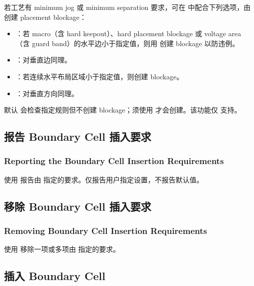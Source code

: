 若工艺有 minimum jog 或 minimum separation 要求，可在  中配合下列选项，由  创建 placement blockage：
\begin{itemize}
  \item {}：若 macro（含 hard keepout）、hard placement blockage 或 voltage area（含 guard band）的水平边小于指定值，则用  创建 blockage 以防违例。
  \item {}：对垂直边同理。
  \item {}：若连续水平布局区域小于指定值，则创建 blockage。
  \item {}：对垂直方向同理。
\end{itemize}

\begin{noteBox}
默认  会检查指定规则但不创建 blockage；须使用  才会创建。该功能仅  支持。
\end{noteBox}

\subsection{报告 Boundary Cell 插入要求}
\subsubsection*{Reporting the Boundary Cell Insertion Requirements}

使用  报告由  指定的要求。仅报告用户指定设置，不报告默认值。

\subsection{移除 Boundary Cell 插入要求}
\subsubsection*{Removing Boundary Cell Insertion Requirements}

使用  移除一项或多项由  指定的要求。

\subsection{插入 Boundary Cell}
